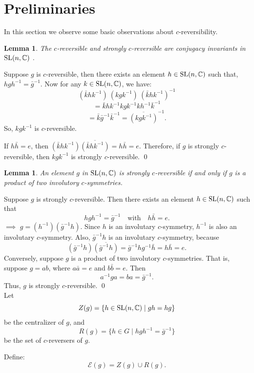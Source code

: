 \documentclass[11pt]{amsart}
\renewenvironment{proof}{{\bfseries Proof.}}{\qed}
\numberwithin{equation}{section}
\theoremstyle{plain}
\newtheorem{lemma}[theorem]{Lemma}
\theoremstyle{definition}
\newcommand{\C}{\mathbb{C}}
\numberwithin{equation}{section}
\def \SL{ {\rm SL}}
\begin{document}
\section{Preliminaries}\label{sec:prelim}
In this section we observe some basic observations about $c$-reversibility. 
	\begin{lemma}
	The $c$-reversible and strongly $c$-reversible are conjugacy invariants in $\SL(n, \C)$ .
\end{lemma}
\begin{proof}
	Suppose $g$ is $c$-reversible, then there exists an element $h \in \SL(n,\C)$ such that, $hgh^{-1} = \bar{g}^{-1}$. Now for any $k \in \SL(n,\C)$, we have:
	\[
		(\bar{k}hk^{-1})~(kgk^{-1})~(\bar{k}hk^{-1})^{-1} 
	\]
	\[
		=\bar{k}hk^{-1}kgk^{-1}kh^{-1}\bar{k}^{-1}
	\]
	\[
		=\bar{k}\bar{g}^{-1}\bar{k}^{-1} = \overline{(kgk^{-1})}^{-1}.
	\]
	So, $kgk^{-1}$ is $c$-reversible.

	If $h\bar{h} = e$, then $(\bar{k}hk^{-1})\overline{(\bar{k}hk^{-1})} = h\bar{h} = e$. Therefore, if $g$ is strongly $c$-reversible, then $kgk^{-1}$ is strongly $c$-reversible. 
\end{proof}
	\begin{lemma}
	An element $g$ in $\SL(n, \C)$ is strongly $c$-reversible if and only if $g$ is a product of two involutory $c$-symmetries.
\end{lemma}
\begin{proof}
	Suppose $g$ is strongly $c$-reversible. Then there exists an element $h \in \SL(n, \C)$ such that 
	\[
	hgh^{-1} = \bar{g}^{-1} \quad \text{with} \quad h\bar{h} = e.
	\]
	\(\implies\) \(g = (h^{-1})(\bar{g}^{-1}h)\). Since $h$ is an involutary $c$-symmetry, $h^{-1}$ is also an involutary $c$-symmetry. Also, $\bar{g}^{-1}h$ is an involutary $c$-symmetry, because
	\[
	(\bar{g}^{-1}h)\overline{(\bar{g}^{-1}h)} = \bar{g}^{-1}hg^{-1}\bar{h} = h\bar{h} = e.
	\]
	Conversely, suppose $g$ is a product of two involutory $c$-symmetries. That is, suppose $g = ab$, where $a\bar{a} = e$ and $b\bar{b} = e$. Then 
	\[
	a^{-1}ga = ba = \bar{g}^{-1}.
	\]
	Thus, $g$ is strongly $c$-reversible.
\end{proof}
    \\
   
    Let 
\[
Z(g) = \{ h \in \SL(n, \C) \mid gh = hg \}
\]
be the centralizer of \( g \), and
\[
R(g) = \{ h \in G \mid hgh^{-1} = \bar{g}^{-1} \}
\]
be the set of \( c \)-reversers of \( g \).

Define:
\[
\mathcal{E}(g) = Z(g) \cup R(g).
\]
\end{document}
